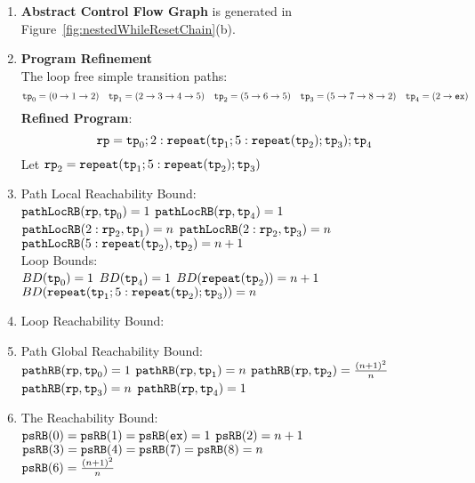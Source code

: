\begin{enumerate}
  \item  \textbf{Abstract Control Flow Graph} is generated in Figure~\ref{fig:nestedWhileResetChain}(b).

  \item \textbf{Program Refinement}
  \\
  The loop free simple transition paths:
  \[
          \mathtt{tp}_0 = (0 \to 1 \to 2)
          \quad
          \mathtt{tp}_1 = (2 \to 3 \to 4 \to 5)
          \quad           
          \mathtt{tp}_2 = (5 \to 6 \to 5)
          \quad
          \mathtt{tp}_3 = (5 \to 7 \to 8 \to 2)
          \quad
          \mathtt{tp}_4 = (2 \to \mathtt{ex})
      \]
  \textbf{Refined Program}:
  \[
  \mathtt{rp} = \mathtt{tp}_0 ; 2: \mathtt{repeat}(\mathtt{tp}_1; 5: \mathtt{repeat}(\mathtt{tp}_2); \mathtt{tp}_3); \mathtt{tp}_4
  \]
Let $\mathtt{rp}_2 = \mathtt{repeat}(\mathtt{tp}_1; 5: \mathtt{repeat}(\mathtt{tp}_2); \mathtt{tp}_3)$
\item {Path Local Reachability Bound}:
\\
$\mathtt{pathLocRB}(\mathtt{rp}, \mathtt{tp}_0) = 1$ \quad
$\mathtt{pathLocRB}(\mathtt{rp}, \mathtt{tp}_4) = 1$ \\
$\mathtt{pathLocRB}(2: \mathtt{rp}_2, \mathtt{tp}_1) = n$ \quad
$\mathtt{pathLocRB}(2: \mathtt{rp}_2, \mathtt{tp}_3) = n$ \\
$\mathtt{pathLocRB}(5: \mathtt{repeat}(\mathtt{tp}_2), \mathtt{tp}_2) = n + 1$
%
\\
Loop Bounds:
\\
$BD(\mathtt{tp}_0) = 1$
\quad
$BD(\mathtt{tp}_4) = 1$
\quad
$BD(\mathtt{repeat}(\mathtt{tp}_2)) = n + 1 $
\\
$BD(\mathtt{repeat}(\mathtt{tp}_1; 5: \mathtt{repeat}(\mathtt{tp}_2); \mathtt{tp}_3)) = n $
%
\item Loop Reachability Bound:
\\
%
%
\item Path Global Reachability Bound:
\\
$\mathtt{pathRB}(\mathtt{rp}, \mathtt{tp}_0) = 1$ \quad
$\mathtt{pathRB}(\mathtt{rp}, \mathtt{tp}_1) = n$ \quad
$\mathtt{pathRB}(\mathtt{rp}, \mathtt{tp}_2) = \frac{(n + 1)^2}{n}$ \\
$\mathtt{pathRB}(\mathtt{rp}, \mathtt{tp}_3) = n$ \quad
$\mathtt{pathRB}(\mathtt{rp}, \mathtt{tp}_4) = 1$
%
\item The Reachability Bound:
\\
$\mathtt{psRB}(0) = \mathtt{psRB}(1) = \mathtt{psRB}(\mathtt{ex}) = 1$ \quad
$\mathtt{psRB}(2) = n + 1$ \\
$\mathtt{psRB}(3) = \mathtt{psRB}(4) =\mathtt{psRB}(7) = \mathtt{psRB}(8) = n$ \quad \\
$\mathtt{psRB}(6) = \frac{(n + 1)^2}{n} $ \quad
{}
\end{enumerate}